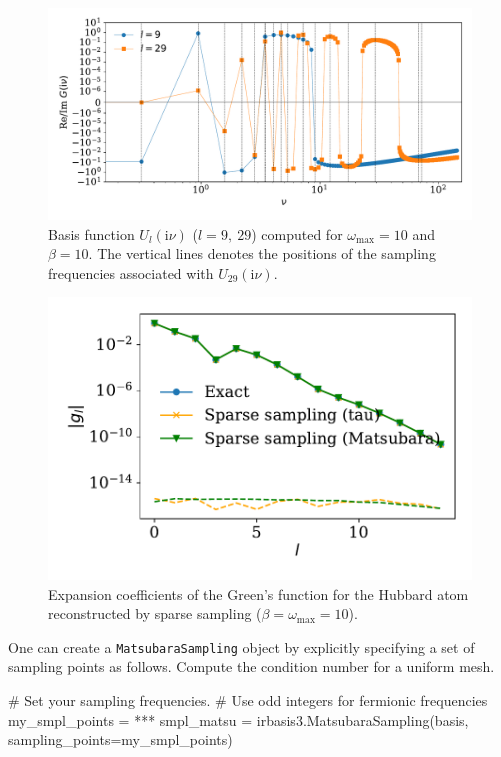 \documentclass[submission, LectureNotes]{SciPost}
\newcommand{\wmax}{\ensuremath{{\omega_\mathrm{max}}}}
\newcommand\ii{\mathrm{i}}%
\newcommand\iv{\ii\nu}%
\begin{document}
\begin{figure}
    \centering
    \includegraphics[width=\columnwidth]{uhat.pdf}
    \caption{
    Basis function $U_l(\iv)$ ($l=9,~29$) computed for $\wmax=10$ and $\beta=10$.
    The vertical lines denotes the positions of the sampling frequencies associated
    with $U_{29}(\iv)$.
    }
    \label{fig:sampling_points_matsubara}
\end{figure}
\begin{figure}
    \centering
    \includegraphics[width=0.7\columnwidth]{gl_sparse.pdf}
    \caption{
        Expansion coefficients of the Green's function for the Hubbard atom
        reconstructed by sparse sampling ($\beta=\wmax=10$).
    }
    \label{fig:sparse_sampling_gl}
\end{figure}


\begin{Exercise}
    One can create a \texttt{MatsubaraSampling} object by explicitly specifying a set of sampling points as follows.
    Compute the condition number for a uniform mesh.
    \begin{python}
    # Set your sampling frequencies.
    # Use odd integers for fermionic frequencies
    my_smpl_points = ***
    smpl_matsu = irbasis3.MatsubaraSampling(basis, sampling_points=my_smpl_points)
    \end{python}
\end{Exercise}
\end{document}

